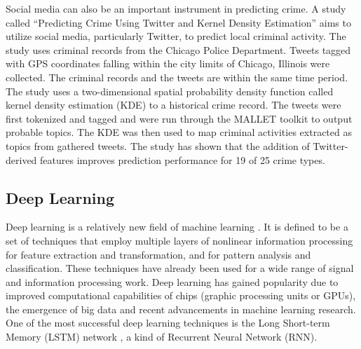     Social media can also be an important instrument in predicting crime. A study called “Predicting Crime Using Twitter and Kernel Density Estimation” \cite{gerber2014predicting} aims to utilize social media, particularly Twitter, to predict local criminal activity. The study uses criminal records from the Chicago Police Department. Tweets tagged with GPS coordinates falling within the city limits of Chicago, Illinois were collected. The criminal records and the tweets are within the same time period. The study uses a two-dimensional spatial probability density function called kernel density estimation (KDE) to a historical crime record. The tweets were first tokenized and tagged and were run through the MALLET toolkit to output probable topics. The KDE was then used to map criminal activities extracted as topics from gathered tweets. The study has shown that the addition of Twitter-derived features improves prediction performance for 19 of 25 crime types.

\subsection{Deep Learning}
    Deep learning is a relatively new field of machine learning \cite{deng2014deep}. It is defined to be a set of techniques that employ multiple layers of nonlinear information processing for feature extraction and transformation, and for pattern analysis and classification. These techniques have already been used for a wide range of signal and information processing work. Deep learning has gained popularity due to improved computational capabilities of chips (graphic processing units or GPUs), the emergence of big data and recent advancements in machine learning research. One of the most successful deep learning techniques is the Long Short-term Memory (LSTM) network \cite{schmidhuber2015deep}, a kind of Recurrent Neural Network (RNN).

